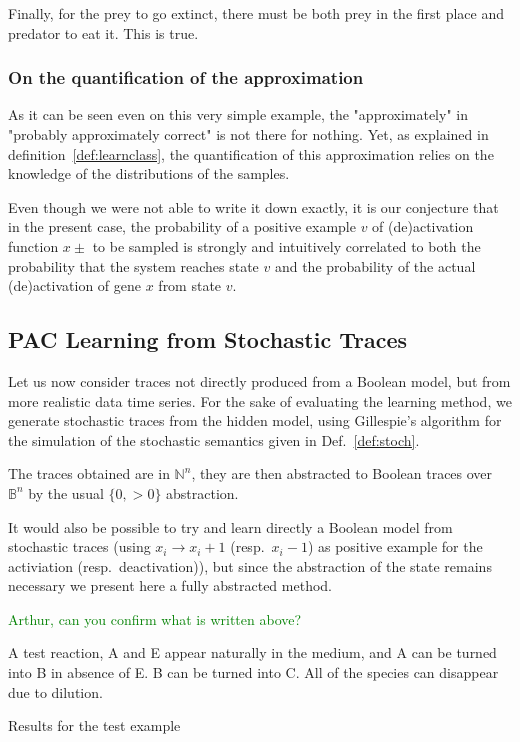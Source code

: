 \documentclass{llncs}
\newcommand{\sylvain}[1]{\textcolor{green}{#1}}
\newcommand{\lra}{\longrightarrow}
\begin{document}
Finally, for the prey to go extinct, there must be both prey in the first place and predator to eat it. This is true.

\subsubsection{On the quantification of the approximation}

As it can be seen even on this very simple example, the "approximately" in "probably approximately correct" is not there for nothing. Yet, as explained in definition~\ref{def:learnclass}, the quantification of this approximation relies on the knowledge of the distributions of the samples.

Even though we were not able to write it down exactly, it is our conjecture that in the present case, the probability of a positive example $v$ of (de)activation function $x\pm$ to be sampled is strongly and intuitively correlated to both the probability that the system reaches state $v$ and the probability of the actual (de)activation of gene $x$ from state $v$. 



\subsection{PAC Learning from Stochastic Traces}

Let us now consider traces not directly produced from a Boolean model, but from more realistic data time series.
For the sake of evaluating the learning method,
we generate stochastic traces from the hidden model, using Gillespie's
algorithm for the simulation of the stochastic semantics given in
Def.~\ref{def:stoch}.

The traces obtained are in ${\mathbb{N}}^n$, they are then abstracted to
Boolean traces over ${\mathbb{B}}^n$ by the usual $\{0, >0\}$ abstraction.

It would also be possible to try and learn directly a Boolean model from
stochastic traces (using $x_i\lra x_i+1$ (resp.\ $x_i-1$) as positive example for the
activiation (resp.\ deactivation)), but since the abstraction of the state
remains necessary we present here a fully abstracted method.

\sylvain{Arthur, can you confirm what is written above?}

\begin{listfig}[hp]
	
	\caption{A test reaction, A and E appear naturally in the medium, and A can be turned into B in absence of E. B  can be turned into C. All of the species can disappear due to dilution.\label{test}}
\end{listfig}
\begin{listfig}[hp]
	
	\caption{Results for the test example\label{test_res}}
\end{listfig}
\end{document}
